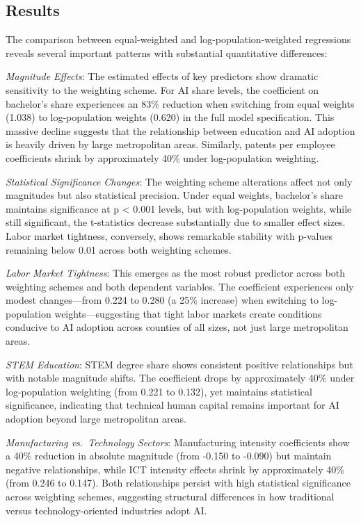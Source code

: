 \documentclass[
]{article}
\begin{document}
\subsection{Results}\label{results}

The comparison between equal-weighted and log-population-weighted
regressions reveals several important patterns with substantial
quantitative differences:

\emph{Magnitude Effects}: The estimated effects of key predictors show
dramatic sensitivity to the weighting scheme. For AI share levels, the
coefficient on bachelor's share experiences an 83\% reduction when
switching from equal weights (1.038) to log-population weights (0.620)
in the full model specification. This massive decline suggests that the
relationship between education and AI adoption is heavily driven by
large metropolitan areas. Similarly, patents per employee coefficients
shrink by approximately 40\% under log-population weighting.

\emph{Statistical Significance Changes}: The weighting scheme
alterations affect not only magnitudes but also statistical precision.
Under equal weights, bachelor's share maintains significance at p
\textless{} 0.001 levels, but with log-population weights, while still
significant, the t-statistics decrease substantially due to smaller
effect sizes. Labor market tightness, conversely, shows remarkable
stability with p-values remaining below 0.01 across both weighting
schemes.

\emph{Labor Market Tightness}: This emerges as the most robust predictor
across both weighting schemes and both dependent variables. The
coefficient experiences only modest changes---from 0.224 to 0.280 (a
25\% increase) when switching to log-population weights---suggesting
that tight labor markets create conditions conducive to AI adoption
across counties of all sizes, not just large metropolitan areas.

\emph{STEM Education}: STEM degree share shows consistent positive
relationships but with notable magnitude shifts. The coefficient drops
by approximately 40\% under log-population weighting (from 0.221 to
0.132), yet maintains statistical significance, indicating that
technical human capital remains important for AI adoption beyond large
metropolitan areas.

\emph{Manufacturing vs.~Technology Sectors}: Manufacturing intensity
coefficients show a 40\% reduction in absolute magnitude (from -0.150 to
-0.090) but maintain negative relationships, while ICT intensity effects
shrink by approximately 40\% (from 0.246 to 0.147). Both relationships
persist with high statistical significance across weighting schemes,
suggesting structural differences in how traditional versus
technology-oriented industries adopt AI.
\end{document}
